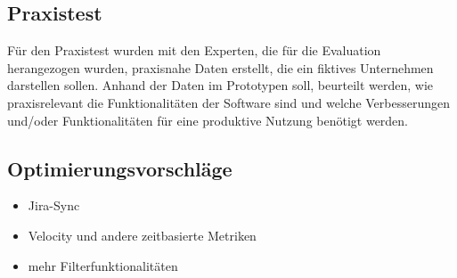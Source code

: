 \subsection{Praxistest}
Für den Praxistest wurden mit den Experten, die für die Evaluation herangezogen wurden, praxisnahe Daten erstellt, die ein fiktives Unternehmen darstellen sollen. Anhand der Daten im Prototypen soll, beurteilt werden, wie praxisrelevant die Funktionalitäten der Software sind und welche Verbesserungen und/oder Funktionalitäten für eine produktive Nutzung benötigt werden.

\subsection{Optimierungsvorschläge}
\begin{itemize}
    \item Jira-Sync
    \item Velocity und andere zeitbasierte Metriken
    \item mehr Filterfunktionalitäten
\end{itemize}